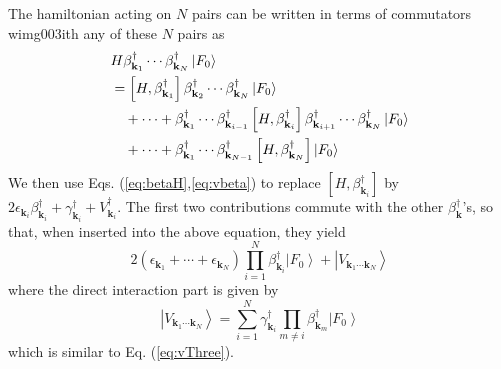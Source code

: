 \documentclass[epj]{svjour}
\newcommand{\vk}{\ensuremath{\mathbf{k}}}
\begin{document}
The hamiltonian acting on $N$ pairs can be written in terms of commutators wimg003ith any of these $N$ pairs as 
\begin{equation}\label{eq:HN}
\begin{split}
&H\beta^{\dagger}_{\mathbf{k} _1}\cdots\beta^{\dagger}_{\mathbf{k}
_N}\left|F_0\right> \\
&=\left[H,\beta^{\dagger}_{\mathbf{k} _1}\right]  \beta^{\dagger}_{%
\mathbf{k} _2}\cdots\beta^{\dagger}_{\mathbf{k} _N}\left|F_0\right> \\
&\quad+\cdots+\beta^{\dagger}_{\mathbf{k} _1}\cdots\beta^{\dagger}_{\mathbf{k} _{i-1}}
\left[H,\beta^{\dagger}_{\mathbf{k} _i}\right]  \beta^{\dagger}_{\mathbf{k}
_{i+1}}\cdots \beta^{\dagger}_{\mathbf{k}_{N}}\left|F_0\right>\\
&\quad+\cdots+\beta^{\dagger}_{\mathbf{k} _1}\cdots\beta^{\dagger}_{\mathbf{k} _{N-1}}
\left[H,\beta^{\dagger}_{\mathbf{k} _N}\right] \left|F_0\right>
\end{split}
\end{equation}
We then use Eqs. (\ref{eq:betaH},\ref{eq:vbeta}) to replace $\left[H,\beta^{\dagger}_{\mathbf{k} _i}\right]$ by $2\epsilon_{\vk_i}\beta^{\dagger}_{\vk_i}+\gamma^{\dagger}_{\vk_i}+V^{\dagger}_{\vk_i}$.  The first two contributions commute with the other $\beta^\dagger_\vk$'s, so that, when inserted into the above equation, they yield
\begin{equation}
2\left(\epsilon_{\mathbf{k} _1}+\cdots+\epsilon_{\mathbf{k} _N}\right)
\prod^N_{i=1}\beta^{\dagger}_{\mathbf{k} _i}\left|F_0\right>+\left|{V}_{\mathbf{k} _1\cdots\mathbf{k} _N}\right> 
\end{equation}
where the direct interaction part is given by 
\begin{equation}  
\left|V_{\mathbf{k} _1\cdots\mathbf{k} _N}\right> =\sum^N_{i=1}\gamma^{\dagger}_{\mathbf{k}_i}\prod_{m\neq{i}}\beta^{\dagger}_{\mathbf{k} _m}\left|F_0\right>   
\end{equation}
which is similar to Eq. (\ref{eq:vThree}). 
\end{document}
